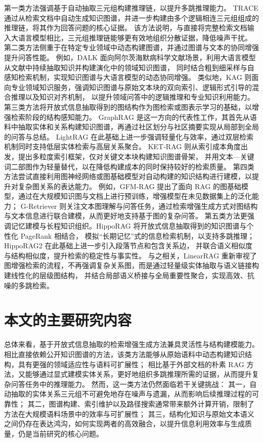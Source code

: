 第一类方法强调基于自动抽取三元组构建推理链，以提升多跳推理能力。
TRACE\cite{fang2024trace} 通过从检索文档中自动生成知识图谱，并进一步构建由多个逻辑相连三元组组成的推理链，将其作为回答问题的核心证据。
该方法说明，与直接将完整检索文档输入大语言模型相比，三元组推理链能够更有效地组织分散证据，降低噪声干扰。
第二类方法侧重于在特定专业领域中动态构建图谱，并通过图谱与文本的协同增强提升问答性能。
例如，DALK\cite{li2024dalk} 面向阿尔茨海默病科学文献场景，利用大语言模型从文献中持续抽取知识并构建演化中的领域知识图谱，
同时结合粗到细采样与自感知检索机制，实现知识图谱与大语言模型的动态协同增强。
类似地，KAG\cite{liang2025kag} 则面向专业领域知识服务，强调知识图谱与原始文本块的双向索引、逻辑形式引导的混合推理以及知识对齐机制，
以提升领域问答中的逻辑推理和专业知识利用能力。
第三类方法将开放式信息抽取得到的图结构作为图检索或图表示学习的基础，以增强检索阶段的结构感知能力。
GraphRAG\cite{graphrag} 是这一方向的代表性工作，其首先从语料中抽取实体和关系构建知识图谱，再通过社区划分与社区摘要实现从局部到全局的问答与总结。
LightRAG\cite{lightrag} 在此基础上进一步强调轻量化与效率，通过双层检索机制同时支持低层实体检索与高层关系聚合。
KET-RAG\cite{ketrag} 则从索引成本角度出发，提出多粒度索引框架，仅对关键文本块构建知识图谱骨架，
并用文本—关键词二部图作为轻量替代，以在降低构建成本的同时保持较好的检索质量。
第四类方法尝试直接利用图神经网络或图基础模型对自动构建的知识结构进行建模，以提升对复杂图关系的表达能力。
例如，GFM-RAG\cite{gfm-rag} 提出了面向 RAG 的图基础模型，通过在大规模知识图与文档上进行预训练，增强模型在未见数据集上的泛化能力；
G-Retriever\cite{g-retriever} 则关注文本图理解与问答任务，通过检索增强生成方式对图结构与文本信息进行联合建模，从而更好地支持基于图的复杂问答。
第五类方法更强调记忆建模与长程知识组织。HippoRAG\cite{hipporag} 将开放式信息抽取得到的知识图谱与个性化 PageRank 相结合，
模拟“长期记忆”式的信息检索机制，以支持多跳推理；HippoRAG2\cite{hipporag2} 在此基础上进一步引入段落节点和包含关系边，
并联合语义相似度与结构相似度，提升检索的稳定性与事实性。
与之相关，LinearRAG\cite{linearrag} 重新审视了图增强检索的流程，不再强调复杂关系图，而是通过轻量级实体抽取与语义链接构建线性化的层级图结构，
并结合局部语义桥接与全局重要性聚合，实现高效、抗噪的多跳检索。

\section{本文的主要研究内容}

总体来看，基于开放式信息抽取的检索增强生成方法兼具灵活性与结构建模能力。
相比直接依赖公开知识图谱的方法，该类方法能够从原始语料中动态构建知识结构，具有更强的领域适应性与语料可扩展性；
相比基于外部文档的朴素 RAG 方法，又能够通过显式建模实体关系，更好地组织多跳推理所需的证据，从而提升复杂问答任务中的推理能力。
然而，这一类方法仍然面临若干关键挑战：
其一，自动抽取的实体关系三元组不可避免地存在噪声与遗漏，从而影响后续推理过程的可靠性；
其二，图谱构建、索引维护以及路径搜索通常带来额外计算开销，限制了方法在大规模语料场景中的效率与可扩展性；
其三，结构化知识与原始文本语义之间仍存在表达鸿沟，如何实现两者的高效融合，以提升信息利用效率与生成质量，仍是当前研究的核心问题。

